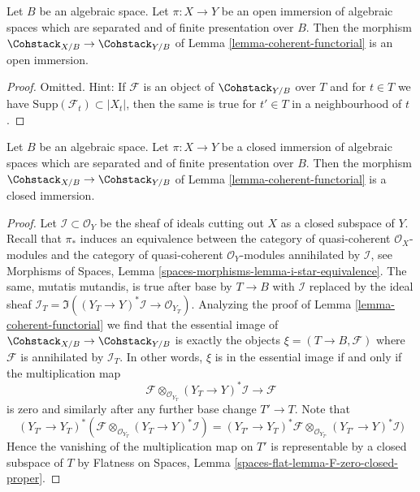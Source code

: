 \begin{lemma}
\label{lemma-coherent-open}
Let $B$ be an algebraic space. Let $\pi : X \to Y$ be an open immersion
of algebraic spaces which are separated and of finite presentation over $B$.
Then the morphism $\Cohstack_{X/B} \to \Cohstack_{Y/B}$ of
Lemma \ref{lemma-coherent-functorial} is an open immersion.
\end{lemma}

\begin{proof}
Omitted. Hint: If $\mathcal{F}$ is an object of $\Cohstack_{Y/B}$ over $T$
and for $t \in T$ we have $\text{Supp}(\mathcal{F}_t) \subset |X_t|$,
then the same is true for $t' \in T$ in a neighbourhood of $t$.
\end{proof}

\begin{lemma}
\label{lemma-coherent-closed}
Let $B$ be an algebraic space. Let $\pi : X \to Y$ be a closed immersion
of algebraic spaces which are separated and of finite presentation over $B$.
Then the morphism $\Cohstack_{X/B} \to \Cohstack_{Y/B}$ of
Lemma \ref{lemma-coherent-functorial} is a closed immersion.
\end{lemma}

\begin{proof}
Let $\mathcal{I} \subset \mathcal{O}_Y$ be the sheaf of ideals cutting
out $X$ as a closed subspace of $Y$. Recall that $\pi_*$ induces
an equivalence between the category of quasi-coherent $\mathcal{O}_X$-modules
and the category of quasi-coherent $\mathcal{O}_Y$-modules annihilated
by $\mathcal{I}$, see Morphisms of Spaces, Lemma
\ref{spaces-morphisms-lemma-i-star-equivalence}.
The same, mutatis mutandis, is true after base by $T \to B$ with
$\mathcal{I}$ replaced by the ideal sheaf
$\mathcal{I}_T = \Im((Y_T \to Y)^*\mathcal{I} \to \mathcal{O}_{Y_T})$.
Analyzing the proof of Lemma \ref{lemma-coherent-functorial}
we find that the essential image of
$\Cohstack_{X/B} \to \Cohstack_{Y/B}$
is exactly the objects $\xi = (T \to B, \mathcal{F})$
where $\mathcal{F}$ is annihilated by $\mathcal{I}_T$.
In other words, $\xi$ is in the essential image if and only if
the multiplication map
$$
\mathcal{F} \otimes_{\mathcal{O}_{Y_T}} (Y_T \to Y)^*\mathcal{I}
\longrightarrow
\mathcal{F}
$$
is zero and similarly after any further base change $T' \to T$.
Note that
$$
(Y_{T'} \to Y_T)^*(
\mathcal{F} \otimes_{\mathcal{O}_{Y_T}} (Y_T \to Y)^*\mathcal{I}) =
(Y_{T'} \to Y_T)^*\mathcal{F} \otimes_{\mathcal{O}_{Y_{T'}}}
(Y_{T'} \to Y)^*\mathcal{I})
$$
Hence the vanishing of the multiplication map on $T'$
is representable by a closed subspace of $T$ by
Flatness on Spaces, Lemma \ref{spaces-flat-lemma-F-zero-closed-proper}.
\end{proof}

